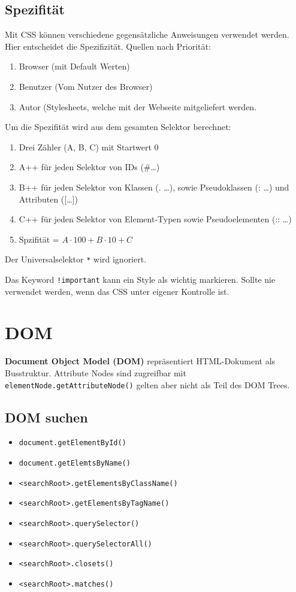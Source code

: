 \documentclass[11pt,twoside,landscape]{article}
\begin{document}
\begin{multicols}{4}
\subsection{Spezifität}
\label{sec:org8b58ff0}
Mit CSS können verschiedene gegensätzliche Anweisungen verwendet werden. Hier entscheidet die Spezifizität. Quellen nach Priorität:
\begin{enumerate}
\item Browser (mit Default Werten)
\item Benutzer (Vom Nutzer des Browser)
\item Autor (Stylesheets, welche mit der Webseite mitgeliefert werden.
\end{enumerate}


Um die Spezifität wird aus dem gesamten Selektor berechnet:
\begin{enumerate}
\item Drei Zähler (A, B, C) mit Startwert 0
\item A++ für jeden Selektor von IDs (\#\ldots{})
\item B++ für jeden Selektor von Klassen (. \ldots{}), sowie Pseudoklassen (: \ldots{}) und Attributen ([\ldots{}])
\item C++ für jeden Selektor von Element-Typen sowie Pseudoelementen (:: \ldots{})
\item Spzifität = \(A \cdot 100 + B \cdot 10 + C\)
\end{enumerate}

Der Universalselektor \texttt{*} wird ignoriert.

Das Keyword \texttt{!important} kann ein Style als wichtig markieren. Sollte nie verwendet werden, wenn das CSS unter eigener Kontrolle ist.
\section{DOM}
\label{sec:orgf99105d}
\textbf{Document Object Model (DOM)} repräsentiert HTML-Dokument als Busstruktur. Attribute Nodes sind zugreifbar mit \texttt{elementNode.getAttributeNode()} gelten aber nicht als Teil des DOM Trees.

\subsection{DOM suchen}
\label{sec:org36221e2}
\begin{itemize}
\item \texttt{document.getElementById()}
\item \texttt{document.getElemtsByName()}
\item \texttt{<searchRoot>.getElementsByClassName()}
\item \texttt{<searchRoot>.getElementsByTagName()}
\item \texttt{<searchRoot>.querySelector()}
\item \texttt{<searchRoot>.querySelectorAll()}
\item \texttt{<searchRoot>.closets()}
\item \texttt{<searchRoot>.matches()}
\end{itemize}


\end{multicols}
\end{document}
